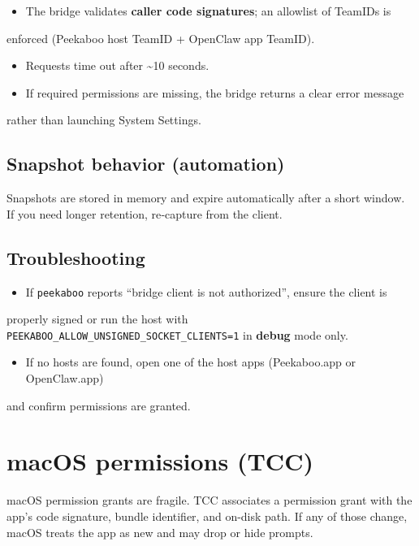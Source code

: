 \begin{itemize}
  \item The bridge validates \textbf{caller code signatures}; an allowlist of TeamIDs is
\end{itemize}

enforced (Peekaboo host TeamID + OpenClaw app TeamID).
\begin{itemize}
  \item Requests time out after \textasciitilde{}10 seconds.
  \item If required permissions are missing, the bridge returns a clear error message
\end{itemize}

rather than launching System Settings.

\subsection{Snapshot behavior (automation)}


Snapshots are stored in memory and expire automatically after a short window.
If you need longer retention, re‑capture from the client.

\subsection{Troubleshooting}


\begin{itemize}
  \item If \texttt{peekaboo} reports “bridge client is not authorized”, ensure the client is
\end{itemize}

properly signed or run the host with \texttt{PEEKABOO\_ALLOW\_UNSIGNED\_SOCKET\_CLIENTS=1}
in \textbf{debug} mode only.
\begin{itemize}
  \item If no hosts are found, open one of the host apps (Peekaboo.app or OpenClaw.app)
\end{itemize}

and confirm permissions are granted.


\clearpage

\section{macOS permissions (TCC)}


macOS permission grants are fragile. TCC associates a permission grant with the
app's code signature, bundle identifier, and on-disk path. If any of those change,
macOS treats the app as new and may drop or hide prompts.

